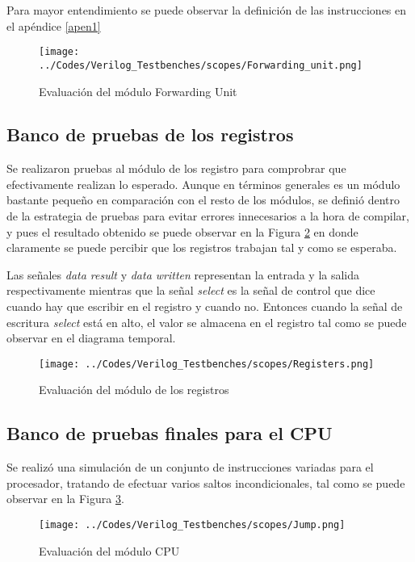 Para mayor entendimiento se puede observar la definici\' on de las instrucciones en el ap\' endice \ref{apen1}

\begin{figure}[hbtp]
\caption{Evaluaci\' on del m\' odulo Forwarding Unit}
\centering
\texttt{[image: ../Codes/Verilog\_Testbenches/scopes/Forwarding\_unit.png]}
\label{fig:forwarding}
\end{figure}



\subsection{Banco de pruebas de los registros}
Se realizaron pruebas al m\' odulo de los registro para comprobrar que efectivamente realizan lo esperado. Aunque en t\' erminos generales es un m\' odulo bastante peque\~ no en comparaci\' on con el resto de los m\' odulos, se defini\' o dentro de la estrategia de pruebas para evitar errores innecesarios a la hora de compilar, y pues el resultado obtenido se puede observar en la Figura \ref{fig:regs} en donde claramente se puede percibir que los registros trabajan tal y como se esperaba.

Las se\~ nales \textit{data result} y \textit{data written} representan la entrada y la salida respectivamente mientras que la se\~ nal \textit{select} es la se\~ nal de control que dice cuando hay que escribir en el registro y cuando no.  Entonces cuando la se\~ nal de escritura \textit{select} est\' a en alto, el valor se almacena en el registro tal como se puede observar en el diagrama temporal.

\begin{figure}[hbtp]
\caption{Evaluaci\' on del m\' odulo de los registros}
\centering
\texttt{[image: ../Codes/Verilog\_Testbenches/scopes/Registers.png]}
\label{fig:regs}
\end{figure}

\subsection{Banco de pruebas finales para el CPU}

Se realiz\' o una simulaci\' on de un conjunto de instrucciones variadas para el procesador, tratando de efectuar varios saltos incondicionales, tal como se puede observar en la Figura \ref{fig:jumps}.

\begin{figure}[hbtp]
\caption{Evaluaci\' on del m\' odulo CPU}
\centering
\texttt{[image: ../Codes/Verilog\_Testbenches/scopes/Jump.png]}
\label{fig:jumps}
\end{figure}

